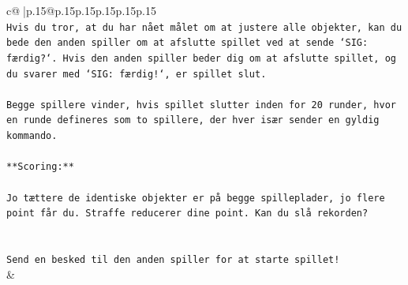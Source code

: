 \documentclass{article}
\begin{document}
{\begin{supertabular}{c@{$\;$}|p{.15\linewidth}@{}p{.15\linewidth}p{.15\linewidth}p{.15\linewidth}p{.15\linewidth}p{.15\linewidth}}
{{{\\ 
\texttt{Hvis du tror, at du har nået målet om at justere alle objekter, kan du bede den anden spiller om at afslutte spillet ved at sende `SIG: færdig?`. Hvis den anden spiller beder dig om at afslutte spillet, og du svarer med `SIG: færdig!`, er spillet slut.} \\
\\ 
\texttt{Begge spillere vinder, hvis spillet slutter inden for 20 runder, hvor en runde defineres som to spillere, der hver især sender en gyldig kommando.} \\
\\ 
\texttt{**Scoring:**} \\
\\ 
\texttt{Jo tættere de identiske objekter er på begge spilleplader, jo flere point får du. Straffe reducerer dine point. Kan du slå rekorden?} \\
\\ 
\\ 
\texttt{Send en besked til den anden spiller for at starte spillet!} \\
            }
        }
    }
    & \\ \\


\end{supertabular}}
\end{document}
